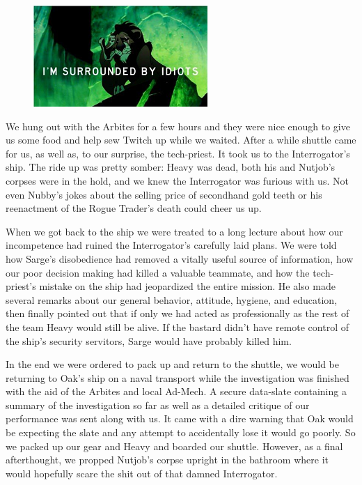 \begin{figure}
\begin{center}
	\includegraphics[width=\figwidth]{pics/3/28.png}
\end{center}
\end{figure}
We hung out with the Arbites for a few hours and they were nice enough to give us some food and help sew Twitch up while we waited. 
After a while shuttle came for us, as well as, to our surprise, the tech-priest. 
It took us to the Interrogator’s ship. 
The ride up was pretty somber: Heavy was dead, both his and Nutjob’s corpses were in the hold, and we knew the Interrogator was furious with us. 
Not even Nubby’s jokes about the selling price of secondhand gold teeth or his reenactment of the Rogue Trader’s death could cheer us up. 

When we got back to the ship we were treated to a long lecture about how our incompetence had ruined the Interrogator’s carefully laid plans. 
We were told how Sarge’s disobedience had removed a vitally useful source of information, how our poor decision making had killed a valuable teammate, and how the tech-priest’s mistake on the ship had jeopardized the entire mission. 
He also made several remarks about our general behavior, attitude, hygiene, and education, then finally pointed out that if only we had acted as professionally as the rest of the team Heavy would still be alive. 
If the bastard didn’t have remote control of the ship’s security servitors, Sarge would have probably killed him.

In the end we were ordered to pack up and return to the shuttle, we would be returning to Oak’s ship on a naval transport while the investigation was finished with the aid of the Arbites and local Ad-Mech. 
A secure data-slate containing a summary of the investigation so far as well as a detailed critique of our performance was sent along with us.
It came with a dire warning that Oak would be expecting the slate and any attempt to accidentally lose it would go poorly. 
So we packed up our gear and Heavy and boarded our shuttle. 
However, as a final afterthought, we propped Nutjob’s corpse upright in the bathroom where it would hopefully scare the shit out of that damned Interrogator.

